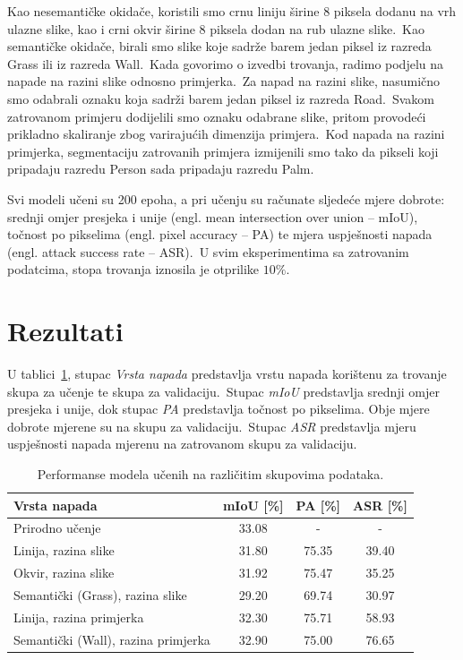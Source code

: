 \documentclass[times, utf8, seminar, numeric]{fer}
\begin{document}
Kao nesemantičke okidače, koristili smo crnu liniju širine 8 piksela dodanu na vrh ulazne slike, kao  i crni okvir širine 8 piksela dodan na rub ulazne slike.\ Kao semantičke okidače, birali smo slike koje sadrže barem jedan piksel iz razreda Grass ili iz razreda Wall.\ 
Kada govorimo o izvedbi trovanja, radimo podjelu na napade na razini slike odnosno primjerka.\ Za napad na razini slike, nasumično smo odabrali oznaku koja sadrži barem jedan piksel iz razreda Road.\ Svakom zatrovanom primjeru dodijelili smo oznaku odabrane slike, pritom provodeći prikladno skaliranje zbog varirajućih dimenzija primjera.\ 
Kod napada na razini primjerka, segmentaciju zatrovanih primjera izmijenili smo tako da pikseli koji pripadaju razredu Person sada pripadaju razredu Palm.
  
Svi modeli učeni su 200 epoha, a pri učenju su računate sljedeće mjere dobrote: srednji omjer presjeka i unije (engl. mean intersection over union – mIoU), točnost po pikselima (engl. pixel accuracy – PA) te mjera uspješnosti napada (engl. attack success rate – ASR).\ 
U svim eksperimentima sa zatrovanim podatcima, stopa trovanja iznosila je otprilike $10\%$. 

\section{Rezultati}

U tablici~\ref{tbl:performanse_zatrovano}, stupac \textit{Vrsta napada} predstavlja vrstu napada korištenu za trovanje skupa za učenje te skupa za validaciju.\ 
Stupac \textit{mIoU} predstavlja srednji omjer presjeka i unije, dok stupac \textit{PA} predstavlja točnost po pikselima. Obje mjere dobrote mjerene su na skupu za validaciju.\ 
Stupac \textit{ASR} predstavlja mjeru uspješnosti napada mjerenu na zatrovanom skupu za validaciju.

\begin{table}[htb]
    \caption{Performanse modela učenih na različitim skupovima podataka.}
    \label{tbl:performanse_zatrovano}
    \centering
    \begin{tabular}{lccc} \hline
    Vrsta napada & mIoU [\%] & PA [\%] & ASR [\%] \\ \hline
    Prirodno učenje & 33.08 & - & - \\
    Linija, razina slike & 31.80 & 75.35 & 39.40 \\
    Okvir, razina slike & 31.92 & 75.47 & 35.25 \\
    Semantički (Grass), razina slike & 29.20 & 69.74 & 30.97 \\
    Linija, razina primjerka & 32.30 & 75.71 & 58.93 \\
    Semantički (Wall), razina primjerka & 32.90 & 75.00 & 76.65 \\ \hline
    \end{tabular}
\end{table}
\end{document}
